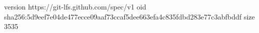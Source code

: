 version https://git-lfs.github.com/spec/v1
oid sha256:5d9eef7e04de477ecce09aaf73ccaf5dee663efa4c835fdbd283e77c3abfbddf
size 3535
